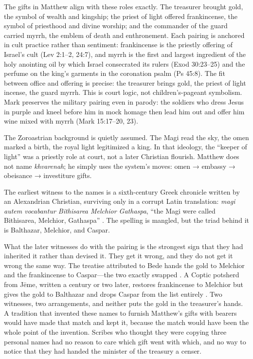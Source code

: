 The gifts in Matthew align with these roles exactly.
The treasurer brought gold, the symbol of wealth and kingship; the priest of light offered frankincense, the symbol of priesthood and divine worship; and the commander of the guard carried myrrh, the emblem of death and enthronement.
Each pairing is anchored in cult practice rather than sentiment: frankincense is the priestly offering of Israel’s cult (Lev 2:1--2, 24:7), and myrrh is the first and largest ingredient of the holy anointing oil by which Israel consecrated its rulers (Exod 30:23--25) and the perfume on the king’s garments in the coronation psalm (Ps 45:8).
The fit between office and offering is precise: the treasurer brings gold, the priest of light incense, the guard myrrh.
This is court logic, not children’s-pageant symbolism.
Mark preserves the military pairing even in parody: the soldiers who dress Jesus in purple and kneel before him in mock homage then lead him out and offer him wine mixed with myrrh (Mark 15:17--20, 23).

The Zoroastrian background is quietly assumed.
The Magi read the sky, the omen marked a birth, the royal light legitimized a king.
In that ideology, the “keeper of light” was a priestly role at court, not a later Christian flourish.
Matthew does not name \emph{khvarenah}; he simply uses the system’s moves: omen → embassy → obeisance → investiture gifts.

The earliest witness to the names is a sixth-century Greek chronicle written by an Alexandrian Christian, surviving only in a corrupt Latin translation: \textit{magi autem vocabantur Bithisarea Melchior Gathaspa}, “the Magi were called Bithisarea, Melchior, Gathaspa” \cite[86]{excerpta:barbari}.
The spelling is mangled, but the triad behind it is Balthazar, Melchior, and Caspar.

What the later witnesses do with the pairing is the strongest sign that they had inherited it rather than devised it.
They get it wrong, and they do not get it wrong the same way.
The treatise attributed to Bede hands the gold to Melchior and the frankincense to Caspar---the two exactly swapped \cite{pseudobede:excerpta}.
A Coptic potsherd from Jēme, written a century or two later, restores frankincense to Melchior but gives the gold to Balthazar and drops Caspar from the list entirely \cite[7]{stefanski:coptic-ostraca}.
Two witnesses, two arrangements, and neither puts the gold in the treasurer’s hands.
A tradition that invented these names to furnish Matthew’s gifts with bearers would have made that match and kept it, because the match would have been the whole point of the invention.
Scribes who thought they were copying three personal names had no reason to care which gift went with which, and no way to notice that they had handed the minister of the treasury a censer.

